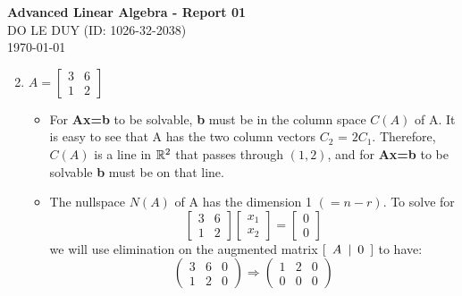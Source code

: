 
\newcommand{\myclass}{Advanced Linear Algebra}
\newcommand{\myname}{DO LE DUY}
\newcommand{\myhwtype}{Report 01}
\newcommand{\mystudentid}{1026-32-2038}




\thispagestyle{plain}
\begin{center}
  {\Large \textbf{\myclass{} - \myhwtype{} }}\\
  \vspace{0.6em} {\myname{} (\small{ID: \mystudentid{}})} \\
  \today
\end{center}

\begin{enumerate}[label={(\arabic*)}]
    \setcounter{enumi}{1}
    \item \(A = \begin{bmatrix} 3 & 6 \\ 1 & 2 \end{bmatrix} \)
    \begin{itemize}
        \item For \textbf{Ax=b} to be solvable, \textbf{b} must be in the column space \(C(A)\) of A. It is easy to see that A has the two column vectors \(C_2\) = \(2C_1\). Therefore, \(C(A)\) is a line in \(\mathbb{R}^2\) that passes through \((1,2)\), and for \textbf{Ax=b} to be solvable \textbf{b} must be on that line.     
        \item The nullspace \(N(A)\) of A has the dimension 1 \((=n-r)\). To solve for 
        \[\begin{bmatrix} 3 & 6 \\ 1 & 2 \end{bmatrix}\begin{bmatrix} x_1 \\ x_2 \end{bmatrix} = \begin{bmatrix} 0 \\ 0 \end{bmatrix}\]
        we will use elimination on the augmented matrix  \([\hspace{0.5em} A \hspace{0.5em} |\hspace{0.5em} 0 \hspace{0.5em}]\)  to have:
        \[\left(\begin{array}{cc|c}  3 & 6 & 0\\ 1 & 2 & 0  \end{array}\right) \Longrightarrow \left(\begin{array}{cc|c}  1 & 2 & 0 \\ 0 & 0 & 0 \end{array}\right) \]

\end{itemize}
\end{enumerate}
